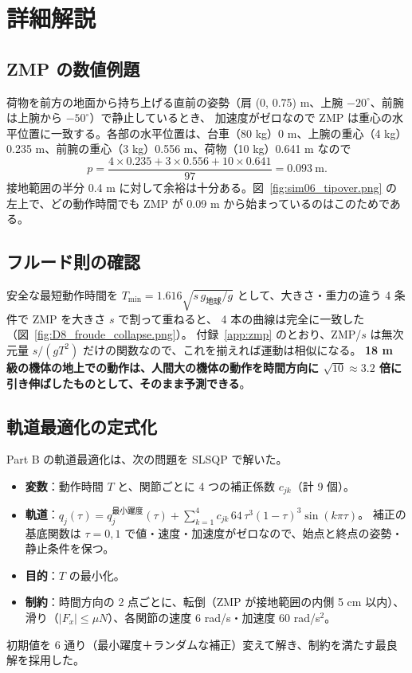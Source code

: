 \section{詳細解説}

\subsection{ZMP の数値例題}

\begin{example}
荷物を前方の地面から持ち上げる直前の姿勢（肩 (0, 0.75) m、上腕 $-20^\circ$、前腕は上腕から $-50^\circ$）で静止しているとき、
加速度がゼロなので ZMP は重心の水平位置に一致する。各部の水平位置は、台車（80 kg）0 m、上腕の重心（4 kg）0.235 m、前腕の重心（3 kg）0.556 m、荷物（10 kg）0.641 m なので
\[
p = \frac{4\times0.235+3\times0.556+10\times0.641}{97} = 0.093\ \text{m}.
\]
接地範囲の半分 0.4 m に対して余裕は十分ある。図~\ref{fig:sim06_tipover.png} の左上で、どの動作時間でも ZMP が 0.09 m から始まっているのはこのためである。
\end{example}

\subsection{フルード則の確認}

安全な最短動作時間を $T_{\min} = 1.616\sqrt{s\,g_{\text{地球}}/g}$ として、大きさ・重力の違う 4 条件で ZMP を大きさ $s$ で割って重ねると、
4 本の曲線は完全に一致した（図~\ref{fig:D8_froude_collapse.png}）。
付録~\ref{app:zmp} のとおり、ZMP/$s$ は無次元量 $s/(gT^2)$ だけの関数なので、これを揃えれば運動は相似になる。
\textbf{18 m 級の機体の地上での動作は、人間大の機体の動作を時間方向に $\sqrt{10}\approx3.2$ 倍に引き伸ばしたものとして、そのまま予測できる}。



\subsection{軌道最適化の定式化}

Part B の軌道最適化は、次の問題を SLSQP で解いた。
\begin{itemize}
\item \textbf{変数}：動作時間 $T$ と、関節ごとに 4 つの補正係数 $c_{jk}$（計 9 個）。
\item \textbf{軌道}：$q_j(\tau) = q_j^{\text{最小躍度}}(\tau) + \sum_{k=1}^4 c_{jk}\,64\,\tau^3(1-\tau)^3\sin(k\pi\tau)$。
  補正の基底関数は $\tau=0,1$ で値・速度・加速度がゼロなので、始点と終点の姿勢・静止条件を保つ。
\item \textbf{目的}：$T$ の最小化。
\item \textbf{制約}：時間方向の 2 点ごとに、転倒（ZMP が接地範囲の内側 5 cm 以内）、滑り（$|F_x|\le\mu N$）、各関節の速度 6 rad/s・加速度 60 rad/s$^2$。
\end{itemize}
初期値を 6 通り（最小躍度＋ランダムな補正）変えて解き、制約を満たす最良解を採用した。

